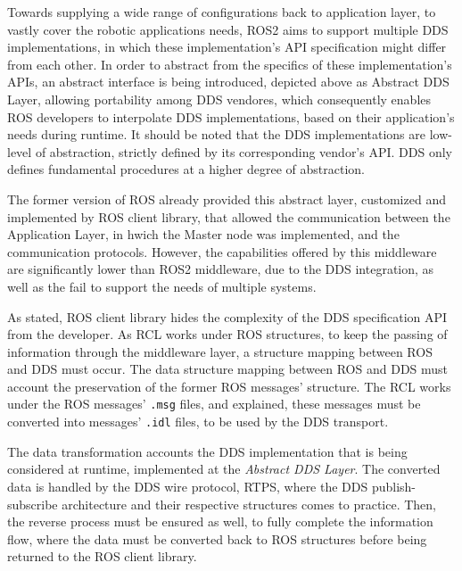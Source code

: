 Towards supplying a wide range of configurations back to application layer, to vastly cover the robotic applications needs, ROS2 aims to support multiple DDS implementations, in which these implementation's API specification might differ from each other. In order to abstract from the specifics of these implementation's APIs, an abstract interface is being introduced, depicted above as Abstract DDS Layer, allowing portability among DDS vendores, which consequently enables ROS developers to interpolate DDS implementations, based on their application's needs during runtime. It should be noted that the DDS implementations are low-level of abstraction, strictly defined by its corresponding vendor's API. DDS only defines fundamental procedures at a higher degree of abstraction.  


The former version of ROS already provided this abstract layer, customized and implemented by ROS client library, that allowed the communication between the Application Layer, in hwich the Master node was implemented, and the communication protocols. However, the capabilities offered by this middleware are significantly lower than ROS2 middleware, due to the DDS integration, as well as the fail to support the needs of multiple systems.

As stated, ROS client library hides the complexity of the DDS specification API from the developer. As RCL works under ROS structures, to keep the passing of information through the middleware layer, a structure mapping between ROS and DDS must occur. The data structure mapping between ROS and DDS must account the preservation of the former ROS messages' structure. The RCL works under the ROS messages' \texttt{.msg} files, and explained, these messages must be converted into messages' \texttt{.idl} files, to be used by the DDS transport.

The data transformation accounts the DDS implementation that is being considered at runtime, implemented at the \textit{Abstract DDS Layer}. The converted data is handled by the DDS wire protocol, RTPS, where the DDS publish-subscribe architecture and their respective structures comes to practice. Then, the reverse process must be ensured as well, to fully complete the information flow, where the data must be converted back to ROS structures before being returned to the ROS client library. \cite{ros-on-dds}


